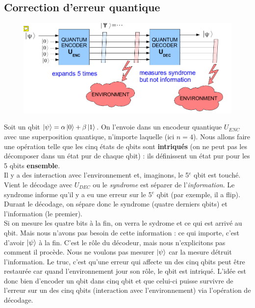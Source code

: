 \subsection{Correction d'erreur quantique}
	\begin{figure}
	\vspace{-5mm}
	\includegraphics[scale=0.2]{ch2/image2.png}
	\end{figure}
Soit un qbit $\ket\psi = \alpha\ket0+\beta\ket1$. On l'envoie dans un encodeur quantique $U_{ENC}$ 
avec une superposition quantique, n'importe laquelle (ici $n=4$). Nous allons faire une opération 
telle que les cinq états de qbits sont \textbf{intriqués} (on ne peut pas les décomposer dans un état pur
de chaque qbit) : ils définissent un état pur pour les 5 qbits \textbf{ensemble}.\\

Il y a des interaction avec l'environnement et, imaginons, le 5$^e$ qbit est touché. Vient le 
décodage avec $U_{DEC}$ ou le \textit{syndrome} est séparer de l'\textit{information}. Le syndrome
informe qu'il y a eu une erreur sur le 5$^e$ qbit (par exemple, il a flip). Durant le décodage, on 
sépare donc le syndrome (quatre derniers qbits) et l'information (le premier).\\

Si on mesure les quatre bits à la fin, on verra le sydrome et ce qui est arrivé au qbit. Mais 
nous n'avons pas besoin de cette information : ce qui importe, c'est d'avoir $\ket\psi$ à la fin. 
C'est le rôle du décodeur, mais nous n'explicitons pas comment il procède. Nous ne voulons pas
mesurer $\ket\psi$ car la mesure détruit l'information. Le truc, c'est qu'une erreur qui affecte
un des cinq qbits peut être restaurée car quand l'environnement jour son rôle, le qbit est intriqué.
L'idée est donc bien d'encoder un qbit dans cinq qbit et que celui-ci puisse survivre de l'erreur
sur un des cinq qbits (interaction avec l'environnement) via l'opération de décodage. \\

